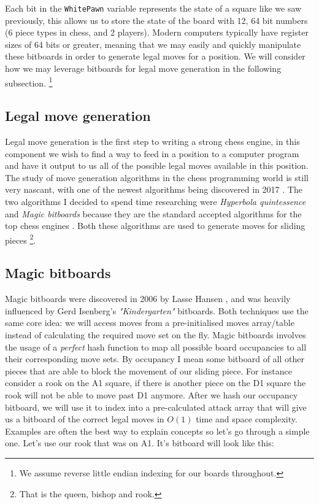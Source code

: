 Each bit in the \texttt{WhitePawn} variable represents the
state of a square like we saw previously, this allows us to 
store the state of the board with 12, 64 bit numbers 
(6 piece types in chess, and 2 players). Modern computers
typically have register sizes of 64 bits or greater, 
meaning that we may easily and quickly manipulate these 
bitboards in order to generate legal moves for a position.
We will consider how we may leverage bitboards for legal 
move generation in the following subsection. 
\footnote{We assume reverse little endian indexing for 
our boards throughout.}

\subsection*{Legal move generation}
Legal move generation is the first step to writing a strong
chess engine, in this component we wish to 
find a way to feed in a position to a computer program and have it 
output to us all of the possible legal moves available in this position.
The study of move generation algorithms in the chess programming world 
is still very nascant, with one of the newest algorithms
being discovered in 2017 \cite{bm}. The two algorithms I
decided to spend time researching were
\textit{Hyperbola quintessence} and 
\textit{Magic bitboards} because they are the standard 
accepted algorithms for the top chess engines 
\cite{stockfish}. Both these algorithms are used to generate
moves for sliding pieces 
\footnote{That is the queen, bishop and rook.}.\\

\subsection*{Magic bitboards}
Magic bitboards were discovered in 2006 by Lasse Hansen
\cite{lasse}, and was heavily influenced by Gerd Isenberg's
\textit{"Kindergarten"} bitboards. Both techniques use the
same core idea: we will access moves from a pre-initialised
moves array/table instead of calculating the required move
set on the fly. Magic bitboards involves the usage of a 
\textit{perfect} hash function to map all possible board
occupancies to all their corresponding move sets. By 
occupancy I mean some bitboard of all other pieces that
are able to block the movement of our sliding piece. For 
instance consider a rook on the A1 square, if there is 
another piece on the D1 square the rook will not be able to 
move past D1 anymore. After we hash our occupancy bitboard,
we will use it to index into a pre-calculated attack array
that will give us a bitboard of the correct legal moves in 
$O(1)$ time and space complexity. Examples are often the 
best way to explain concepts so let's go through a simple one.
Let's use our rook that was on A1. It's bitboard will look 
like this:

